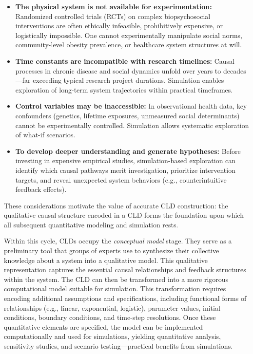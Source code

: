 \documentclass[12pt]{article}
\begin{document}
\begin{itemize}
    \item \textbf{The physical system is not available for experimentation:} Randomized controlled trials (RCTs) on complex biopsychosocial interventions are often ethically infeasible, prohibitively expensive, or logistically impossible. One cannot experimentally manipulate social norms, community-level obesity prevalence, or healthcare system structures at will.
    \item \textbf{Time constants are incompatible with research timelines:} Causal processes in chronic disease and social dynamics unfold over years to decades---far exceeding typical research project durations. Simulation enables exploration of long-term system trajectories within practical timeframes.
    \item \textbf{Control variables may be inaccessible:} In observational health data, key confounders (genetics, lifetime exposures, unmeasured social determinants) cannot be experimentally controlled. Simulation allows systematic exploration of what-if scenarios.
    \item \textbf{To develop deeper understanding and generate hypotheses:} Before investing in expensive empirical studies, simulation-based exploration can identify which causal pathways merit investigation, prioritize intervention targets, and reveal unexpected system behaviors (e.g., counterintuitive feedback effects).
\end{itemize}

\noindent
These considerations motivate the value of accurate CLD construction: the qualitative causal structure encoded in a CLD forms the foundation upon which all subsequent quantitative modeling and simulation rests.

Within this cycle, CLDs occupy the \emph{conceptual model} stage. They serve as a preliminary tool that groups of experts use to synthesize their collective knowledge about a system into a qualitative model. This qualitative representation captures the essential causal relationships and feedback structures within the system. The CLD can then be transformed into a more rigorous computational model suitable for simulation. This transformation requires encoding additional assumptions and specifications, including functional forms of relationships (e.g., linear, exponential, logistic), parameter values, initial conditions, boundary conditions, and time-step resolutions. Once these quantitative elements are specified, the model can be implemented computationally and used for simulations, yielding quantitative analysis, sensitivity studies, and scenario testing---practical benefits from simulations.
\end{document}
